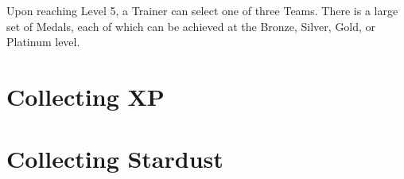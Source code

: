Upon reaching Level 5, a Trainer can select one of three Teams.
There is a large set of Medals, each of which can be achieved at the Bronze,
 Silver, Gold, or Platinum level.

\section{Collecting XP}

\section{Collecting Stardust}
